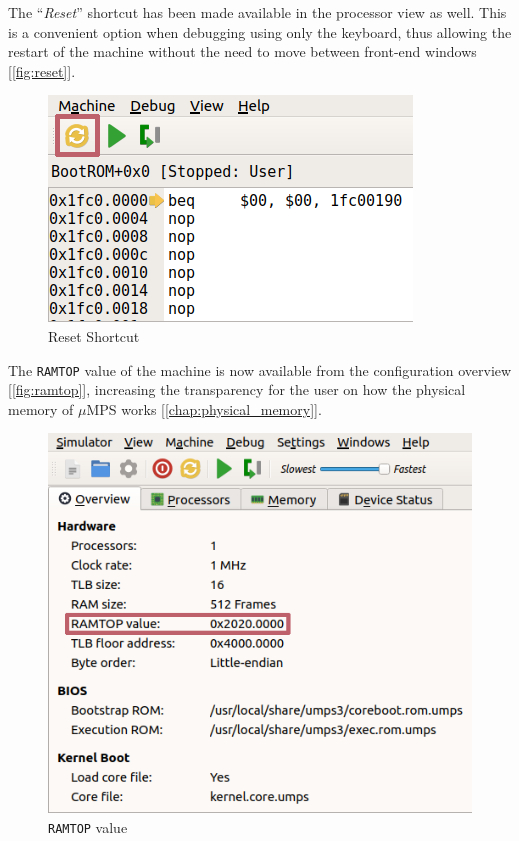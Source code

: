 \documentclass[12pt,a4paper,openright,twoside]{report}
\begin{document}
\clearpage
The ``\textit{Reset}'' shortcut has been made available in the processor view as well.
This is a convenient option when debugging using only the keyboard, thus allowing the restart of the machine without the need to move between front-end windows [\autoref{fig:reset}].
\begin{figure}[h]
	\centering
	\includegraphics[scale=0.7]{reset}
	\caption{Reset Shortcut}
	\label{fig:reset}
\end{figure}

The \texttt{RAMTOP} value of the machine is now available from the configuration overview [\autoref{fig:ramtop}], increasing the transparency for the user on how the physical memory of $\mu$MPS works [\autoref{chap:physical_memory}].
\begin{figure}[h]
	\centering
	\includegraphics[scale=0.72]{ramtop}
	\caption{\texttt{RAMTOP} value}
	\label{fig:ramtop}
\end{figure}
\end{document}
